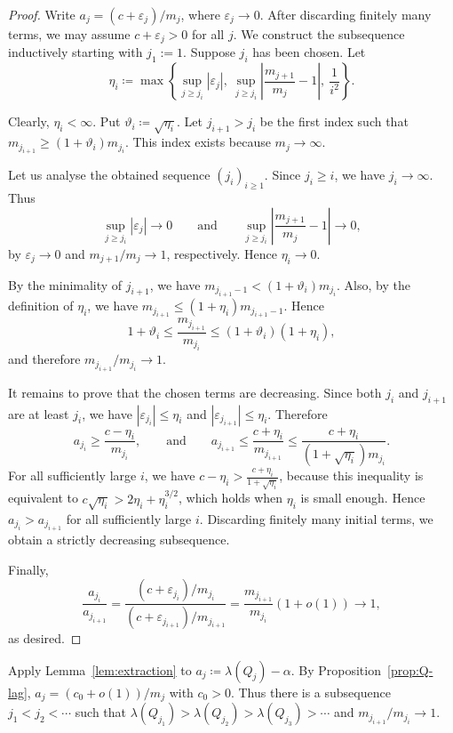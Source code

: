 \documentclass[10pt]{article}
\numberwithin{equation}{section}
\newcommand{\eps}{\varepsilon}
\begin{document}
\begin{proof}
Write $a_j=(c+\eps_j)/{m_j}$, where $\eps_j\to 0$. After discarding finitely many terms, we may assume $c+\eps_j>0$ for all $j$. We construct the subsequence inductively starting with $j_1:=1$. Suppose $j_i$ has been chosen. Let
\[
        \eta_i \coloneqq \max\left\{ \sup_{j\ge j_i}|\eps_j|,\ \sup_{j\ge j_i}\left|\frac{m_{j+1}}{m_j}-1\right|,\ \frac{1}{i^2} \right\}.
\]

Clearly, $\eta_i<\infty$. Put $\vartheta_i\coloneqq \sqrt{\eta_i}$. Let $j_{i+1}>j_i$ be the first index such that $m_{j_{i+1}}\ge (1+\vartheta_i)m_{j_i}$. This index exists because $m_j\to\infty$. 

Let us analyse the obtained sequence $(j_i)_{i\ge 1}$.
Since $j_i\ge i$, we have $j_i\to\infty$. Thus
\[
        \sup_{j\ge j_i}|\eps_j|\to 0
        \qquad\text{and}\qquad
        \sup_{j\ge j_i}\left|\frac{m_{j+1}}{m_j}-1\right|\to 0,
\]
by $\eps_j\to0$ and $m_{j+1}/m_j\to1$, respectively. Hence $\eta_i\to 0$.

By the minimality of $j_{i+1}$, we have $m_{j_{i+1}-1}<(1+\vartheta_i)m_{j_i}$. Also, by the definition of $\eta_i$, we have $m_{j_{i+1}} \le (1+\eta_i)m_{j_{i+1}-1}$. Hence
\[
        1+\vartheta_i \le \frac{m_{j_{i+1}}}{m_{j_i}} \le (1+\vartheta_i)(1+\eta_i),
\]
and therefore $m_{j_{i+1}}/m_{j_i}\to 1$.

It remains to prove that the chosen terms are decreasing. Since both $j_i$ and $j_{i+1}$ are at least $j_i$, we have $|\eps_{j_i}|\le \eta_i$ and $|\eps_{j_{i+1}}|\le \eta_i$. Therefore
\[
        a_{j_i}\ge \frac{c-\eta_i}{m_{j_i}}, \qquad\text{and}\qquad a_{j_{i+1}}\le \frac{c+\eta_i}{m_{j_{i+1}}} \le \frac{c+\eta_i}{(1+\sqrt{\eta_i})m_{j_i}}.
\]
For all sufficiently large $i$, we have $c-\eta_i>\frac{c+\eta_i}{1+\sqrt{\eta_i}}$, because this inequality is equivalent to $c\sqrt{\eta_i}>2\eta_i+\eta_i^{3/2}$, which holds when $\eta_i$ is small enough. Hence $a_{j_i}>a_{j_{i+1}}$ for all sufficiently large $i$. Discarding finitely many initial terms, we obtain a strictly decreasing subsequence.

Finally,
\[
        \frac{a_{j_i}}{a_{j_{i+1}}} = \frac{(c+\eps_{j_i})/m_{j_i}}{(c+\eps_{j_{i+1}})/m_{j_{i+1}}} = \frac{m_{j_{i+1}}}{m_{j_i}}(1+o(1))\to 1, 
\]
as desired. 
\end{proof}

Apply Lemma~\ref{lem:extraction} to $a_j\coloneqq \lambda(Q_j)-\alpha$. By Proposition~\ref{prop:Q-lag}, $a_j=(c_0+o(1))/{m_j}$ with $c_0 > 0$. Thus there is a subsequence $j_1<j_2<\cdots$ such that $\lambda(Q_{j_1})>\lambda(Q_{j_2})>\lambda(Q_{j_3})>\cdots$ and ${m_{j_{i+1}}}/{m_{j_i}}\to 1$.
\end{document}

